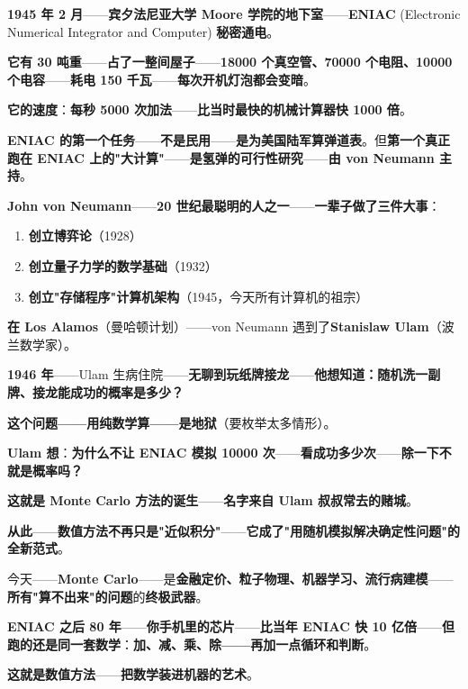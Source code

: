 \begin{tcolorbox}[storybox={\Large 小故事：ENIAC 与现代数值计算的诞生}]
\textbf{1945 年 2 月}——\textbf{宾夕法尼亚大学 Moore 学院的地下室}——\textbf{ENIAC} (Electronic Numerical Integrator and Computer) \textbf{秘密通电}。

\medskip

\textbf{它有 30 吨重}——\textbf{占了一整间屋子}——\textbf{18000 个真空管、70000 个电阻、10000 个电容}——\textbf{耗电 150 千瓦}——\textbf{每次开机灯泡都会变暗}。

\textbf{它的速度}：\textbf{每秒 5000 次加法}——\textbf{比当时最快的机械计算器快 1000 倍}。

\medskip

\textbf{ENIAC 的第一个任务}——\textbf{不是民用}——\textbf{是为美国陆军算弹道表}。但\textbf{第一个真正跑在 ENIAC 上的"大计算"}——\textbf{是氢弹的可行性研究}——\textbf{由 von Neumann 主持}。

\medskip

\textbf{John von Neumann}——\textbf{20 世纪最聪明的人之一}——\textbf{一辈子做了三件大事}：

\begin{enumerate}
\item \textbf{创立博弈论}（1928）
\item \textbf{创立量子力学的数学基础}（1932）
\item \textbf{创立"存储程序"计算机架构}（1945，今天所有计算机的祖宗）
\end{enumerate}

\medskip

\textbf{在 Los Alamos}（曼哈顿计划）——von Neumann 遇到了\textbf{Stanislaw Ulam}（波兰数学家）。

\textbf{1946 年}——Ulam 生病住院——\textbf{无聊到玩纸牌接龙}——\textbf{他想知道：随机洗一副牌、接龙能成功的概率是多少？}

\textbf{这个问题——用纯数学算——是地狱}（要枚举太多情形）。

\textbf{Ulam 想}：\textbf{为什么不让 ENIAC 模拟 10000 次}——\textbf{看成功多少次}——\textbf{除一下不就是概率吗？}

\medskip

\textbf{这就是 Monte Carlo 方法的诞生}——\textbf{名字来自 Ulam 叔叔常去的赌城}。

\medskip

\textbf{从此}——\textbf{数值方法不再只是"近似积分"}——\textbf{它成了"用随机模拟解决确定性问题"的全新范式}。

今天——\textbf{Monte Carlo}——是\textbf{金融定价、粒子物理、机器学习、流行病建模}——\textbf{所有"算不出来"的问题}的\textbf{终极武器}。

\medskip

\textbf{ENIAC 之后 80 年}——\textbf{你手机里的芯片}——\textbf{比当年 ENIAC 快 10 亿倍}——\textbf{但跑的还是同一套数学}：\textbf{加、减、乘、除——再加一点循环和判断}。

\textbf{这就是数值方法}——\textbf{把数学装进机器的艺术}。
\end{tcolorbox}

